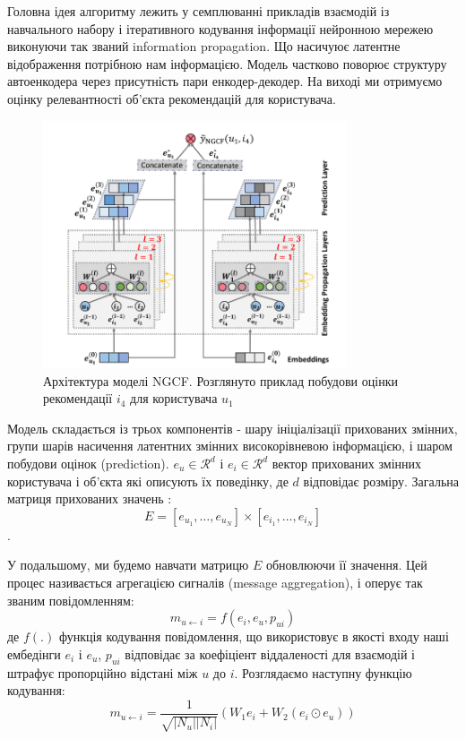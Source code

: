 Головна ідея алгоритму лежить у семплюванні прикладів взаємодій із навчального набору і ітеративного кодування інформації нейронною мережею виконуючи так званий information propagation. Що насичуює латентне відображення потрібною нам інформацією. Модель частково поворює структуру автоенкодера через присутність пари енкодер-декодер. На виході ми отримуємо оцінку релевантності об’єкта рекомендацій для користувача.   

\begin{figure}
    \centering
    \includegraphics[width=0.8\textwidth]{images/NGCF.png}
    \caption{Архітектура моделі NGCF. Розглянуто приклад побудови оцінки рекомендації $i_4$ для користувача $u_1$}
\end{figure}

Модель складається із трьох компонентів - шару ініціалізації прихованих змінних, групи шарів насичення латентних змінних високорівневою інформацією, і шаром побудови оцінок (prediction). $e_u \in \mathcal{R}^{d}$ і $e_i \in \mathcal{R}^{d}$ вектор прихованих змінних користувача і об’єкта які описують їх поведінку, де $d$ відповідає розміру. Загальна матриця прихованих значень :
\[ E = [e_{u_1},\ldots, e_{u_N}] \times [e_{i_1},\ldots, e_{i_N}] \]. 

У подальшому, ми будемо навчати матрицю $E$ обновлюючи її значення. Цей процес називається агрегацією сигналів (message aggregation), і оперує так званим повідомленням:
\[m_{u \leftarrow i} = f(e_i, e_u, p_{ui})\]
де  $f(.)$ функція кодування повідомлення, що використовує в якості входу наші ембедінги $e_i$ і  $e_u$, $p_{ui}$ відповідає за коефіціент віддаленості для взаємодій і штрафує пропорційно відстані між $u$ до $i$.
Розглядаємо наступну функцію кодування:
\[ m_{u \leftarrow i} = \frac{1}{\sqrt{|N_{u}| |{N_{i}|}}} (W_1e_i + W_2(e_i \odot e_u))\]

